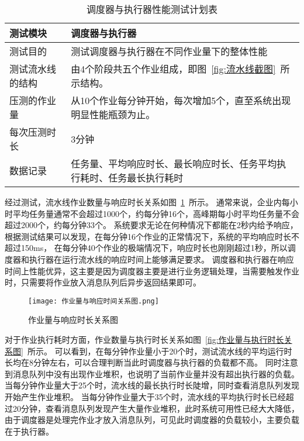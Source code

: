 \begin{table}[ht]
  \centering
  \caption{调度器与执行器性能测试计划表}
  \label{tab:调度器与执行器性能测试计划表}
  \renewcommand{\arraystretch}{1.5}
  \begin{tabular}{|p{3cm}|p{10cm}|}
  \hline
  测试模块 & 调度器与执行器 \\ \hline
  测试目的 & 测试调度器与执行器在不同作业量下的整体性能 \\ \hline
  测试流水线的结构 & 由4个阶段共五个作业组成，即图~\ref{fig:流水线截图}~所示结构。\\ \hline
  压测的作业量 & 从10个作业每分钟开始，每次增加5个，直至系统出现明显性能瓶颈为止。\\ \hline
  每次压测时长 & 3分钟\\ \hline
  数据记录 & 任务量、平均响应时长、最长响应时长、任务平均执行耗时、任务最长执行耗时\\ \hline
  \end{tabular}
\end{table}

经过测试，流水线作业数量与响应时长关系如图~\ref{fig:作业量与响应时长关系图}~所示。
通常来说，企业内每小时平均任务量通常不会超过1000个，约每分钟16个，高峰期每小时平均任务量不会超过2000个，约每分钟33个。
系统要求无论在何种情况下都能在2秒内给予响应，根据测试结果可以发现，在每分钟16个作业的正常情况下，系统的平均响应时长不超过150ms，
在每分钟40个作业的极端情况下，响应时长也刚刚超过1秒，所以调度器和执行器在运行流水线的响应时间上能够满足要求。
调度器和执行器在响应时间上性能优异，这主要是因为调度器主要是进行业务逻辑处理，当需要触发作业时，只需要将作业放入消息队列后异步返回结果即可。

\begin{figure}[h]
  \centering
  \texttt{[image: 作业量与响应时间关系图.png]}
  \caption{作业量与响应时长关系图}
  \label{fig:作业量与响应时长关系图}
\end{figure}

对于作业执行耗时方面，作业数量与执行时长关系如图~\ref{fig:作业量与执行时长关系图}~所示。
可以看到，在每分钟作业量小于20个时，测试流水线的平均运行时长均在8分钟左右，可以合理判断当此时调度器与执行器的负载都不高。
同时注意到消息队列中没有出现作业堆积，也说明了当前作业量并没有超出执行器的负载。
当每分钟作业量大于25个时，流水线的最长执行时长陡增，同时查看消息队列发现开始产生作业堆积。
当每分钟作业量大于35个时，流水线的平均执行时长已经超过20分钟，查看消息队列发现产生大量作业堆积，此时系统可用性已经大大降低，
由于调度器是处理完作业才放入消息队列，可见此时调度器的负载较小，主要负载在于执行器。

